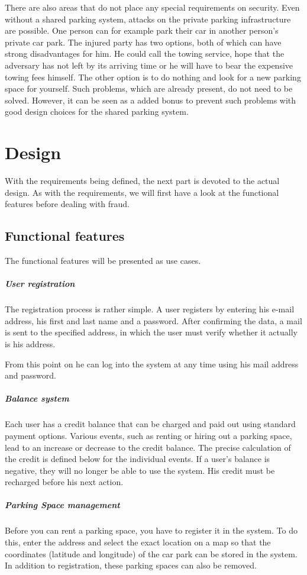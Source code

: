 \documentclass[
a4paper,     %
titlepage,   %
14pt         %
]{scrartcl}  %
\theoremstyle{mystyle}
\begin{document}
There are also areas that do not place any special requirements on security. Even without a shared parking system, attacks on the private parking infrastructure are possible. One person can for example park their car in another person's private car park. The injured party has two options, both of which can have strong disadvantages for him. He could call the towing service, hope that the adversary has not left by its arriving time or he will have to bear the expensive towing fees himself. The other option is to do nothing and look for a new parking space for yourself. Such problems, which are already present, do not need to be solved. However, it can be seen as a added bonus to prevent such problems with good design choices for the shared parking system.


\section{Design}\label{chapter:design}
With the requirements being defined, the next part is devoted to the actual design. As with the requirements, we will first have a look at the functional features before dealing with fraud.

\subsection{Functional features}
The functional features will be presented as use cases.
\subparagraph{User registration} The registration process is rather simple. A user registers by entering his e-mail address, his first and last name and a password. After confirming the data, a mail is sent to the specified address, in which the user must verify whether it actually is his address.

From this point on he can log into the system at any time using his mail address and password.

\subparagraph{Balance system} Each user has a credit balance that can be charged and paid out using standard payment options. Various events, such as renting or hiring out a parking space, lead to an increase or decrease to the credit balance. The precise calculation of the credit is defined below for the individual events. If a user's balance is negative, they will no longer be able to use the system. His credit must be recharged before his next action.

\subparagraph{Parking Space management} Before you can rent a parking space, you have to register it in the system. To do this, enter the address and select the exact location on a map so that the coordinates (latitude and longitude) of the car park can be stored in the system. In addition to registration, these parking spaces can also be removed.
\end{document}
